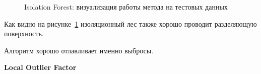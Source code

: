 \documentclass[12pt]{article}
\begin{document}
    \begin{figure}[h!]
        \centering
        \caption{Isolation Forest: визуализация работы метода на тестовых данных}
        \label{sec:Research:Model:Visualization:fig:IsolationForest}
    \end{figure}

    \par Как видно на рисунке~\ref{sec:Research:Model:Visualization:fig:IsolationForest} изоляционный лес также хорошо проводит разделяющую поверхность.
    \par Алгоритм хорошо отлавливает именно выбросы.

    \newpage


    \textbf{Local Outlier Factor} \\
\end{document}
